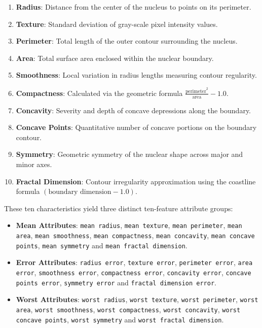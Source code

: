 \documentclass[12pt,a4paper]{article}
\begin{document}
\begin{enumerate}
\item \textbf{Radius}: Distance from the center of the nucleus to points on its perimeter.
\item \textbf{Texture}: Standard deviation of gray-scale pixel intensity values.
\item \textbf{Perimeter}: Total length of the outer contour surrounding the nucleus.
\item \textbf{Area}: Total surface area enclosed within the nuclear boundary.
\item \textbf{Smoothness}: Local variation in radius lengths measuring contour regularity.
\item \textbf{Compactness}: Calculated via the geometric formula $\frac{\text{perimeter}^2}{\text{area}} - 1.0$.
\item \textbf{Concavity}: Severity and depth of concave depressions along the boundary.
\item \textbf{Concave Points}: Quantitative number of concave portions on the boundary contour.
\item \textbf{Symmetry}: Geometric symmetry of the nuclear shape across major and minor axes.
\item \textbf{Fractal Dimension}: Contour irregularity approximation using the coastline formula $(\text{boundary dimension} - 1.0)$.
\end{enumerate}

These ten characteristics yield three distinct ten-feature attribute groups:
\begin{itemize}
\item \textbf{Mean Attributes}: \texttt{mean radius}, \texttt{mean texture}, \texttt{mean perimeter}, \texttt{mean area}, \texttt{mean smoothness}, \texttt{mean compactness}, \texttt{mean concavity}, \texttt{mean concave points}, \texttt{mean symmetry} and \texttt{mean fractal dimension}.
\item \textbf{Error Attributes}: \texttt{radius error}, \texttt{texture error}, \texttt{perimeter error}, \texttt{area error}, \texttt{smoothness error}, \texttt{compactness error}, \texttt{concavity error}, \texttt{concave points error}, \texttt{symmetry error} and \texttt{fractal dimension error}.
\item \textbf{Worst Attributes}: \texttt{worst radius}, \texttt{worst texture}, \texttt{worst perimeter}, \texttt{worst area}, \texttt{worst smoothness}, \texttt{worst compactness}, \texttt{worst concavity}, \texttt{worst concave points}, \texttt{worst symmetry} and \texttt{worst fractal dimension}.
\end{itemize}
\end{document}
